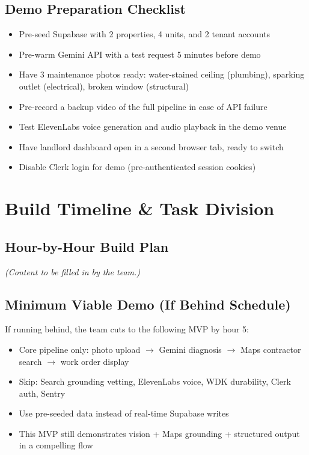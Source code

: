 \documentclass[12pt,a4paper]{article}
\begin{document}
\subsection{Demo Preparation Checklist}

\begin{itemize}
    \item Pre-seed Supabase with 2 properties, 4 units, and 2 tenant accounts
    \item Pre-warm Gemini API with a test request 5 minutes before demo
    \item Have 3 maintenance photos ready: water-stained ceiling (plumbing), sparking outlet (electrical), broken window (structural)
    \item Pre-record a backup video of the full pipeline in case of API failure
    \item Test ElevenLabs voice generation and audio playback in the demo venue
    \item Have landlord dashboard open in a second browser tab, ready to switch
    \item Disable Clerk login for demo (pre-authenticated session cookies)
\end{itemize}

\section{Build Timeline \& Task Division}

\subsection{Hour-by-Hour Build Plan}

\emph{(Content to be filled in by the team.)}

\subsection{Minimum Viable Demo (If Behind Schedule)}

If running behind, the team cuts to the following MVP by hour 5:

\begin{itemize}
    \item Core pipeline only: photo upload $\rightarrow$ Gemini diagnosis $\rightarrow$ Maps contractor search $\rightarrow$ work order display
    \item Skip: Search grounding vetting, ElevenLabs voice, WDK durability, Clerk auth, Sentry
    \item Use pre-seeded data instead of real-time Supabase writes
    \item This MVP still demonstrates vision + Maps grounding + structured output in a compelling flow
\end{itemize}
\end{document}
